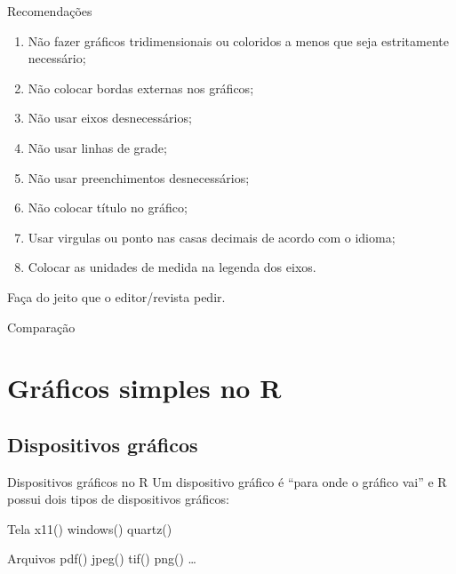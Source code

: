 \documentclass{beamer}
\begin{document}
\begin{frame}{Recomendações}

  \begin{enumerate}[<+->]
  \item Não fazer gráficos tridimensionais ou coloridos a menos que seja estritamente necessário;
  \item Não colocar bordas externas nos gráficos;
  \item Não usar eixos desnecessários;
  \item Não usar linhas de grade;
  \item Não usar preenchimentos desnecessários;
  \item Não colocar título no gráfico;
  \item Usar virgulas ou  ponto nas casas decimais de acordo com o idioma;
  \item Colocar as unidades de medida na legenda dos eixos.
  \end{enumerate}
  \pause
Faça do jeito que o editor/revista pedir.
\end{frame}

\begin{frame}{Comparação}
\centering
{}
  
\end{frame}
\section{Gráficos simples no R}
\subsection{Dispositivos gráficos}

\begin{frame}{Dispositivos gráficos no R}
  Um dispositivo gráfico é ``para onde o gráfico vai'' e  R possui dois tipos de dispositivos gráficos:

\begin{block}{Tela}
x11() windows() quartz()  
\end{block}
  
\begin{block}{Arquivos}
pdf() jpeg() tif() png() \ldots
\end{block}
\end{frame}
\end{document}
